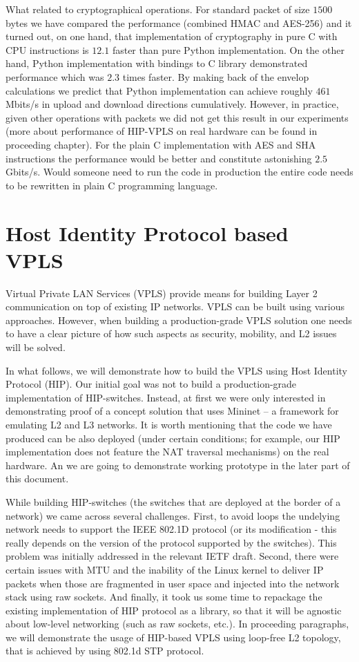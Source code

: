 What related to cryptographical operations. For standard packet of size $1500$ 
bytes we have compared the performance (combined HMAC and AES-256) and it turned 
out, on one hand, that implementation of cryptography in pure C with CPU instructions is 
$12.1$ faster than pure Python implementation. On the other hand, Python implementation with bindings
to C library demonstrated performance which was $2.3$ times faster. By making back of the envelop calculations
we predict that Python implementation can achieve roughly $461$ Mbits/s in upload and download directions
cumulatively. However, in practice, given other operations with packets we did not get this result 
in our experiments (more about performance of HIP-VPLS on real hardware can be found in proceeding 
chapter). For the plain C implementation with AES and SHA instructions the performance would be 
better and constitute astonishing $2.5$ Gbits/s. Would someone need to run the code in production
the entire code needs to be rewritten in plain C programming language.

\section{Host Identity Protocol based VPLS}

Virtual Private LAN Services (VPLS) provide means for building Layer 2 communication 
on top of existing IP networks. VPLS can be built using various approaches. However, 
when building a production-grade VPLS solution one needs to have a clear picture of 
how such aspects as security, mobility, and L2 issues will be solved.

In what follows, we will demonstrate how to build the VPLS using Host Identity Protocol (HIP). 
Our initial goal was not to build a production-grade implementation of HIP-switches. Instead, 
at first we were only interested in demonstrating proof of a concept solution that uses 
Mininet – a framework for emulating L2 and L3 networks. It is worth mentioning that the code 
we have produced can be also deployed (under certain conditions; for example, our HIP implementation 
does not feature the NAT traversal mechanisms) on the real hardware. An we are going to demonstrate 
working prototype in the later part of this document.

While building HIP-switches (the switches that are deployed at the border of a network) 
we came across several challenges. First, to avoid loops the undelying network needs to support 
the IEEE 802.1D protocol (or its modification - this really depends on the version of the protocol 
supported by the switches). This problem was initially addressed in the relevant IETF draft. 
Second, there were certain issues with MTU and the inability of the Linux kernel to deliver IP 
packets when those are fragmented in user space and injected into the network stack using raw 
sockets. And finally, it took us some time to repackage the existing implementation of HIP protocol 
as a library, so that it will be agnostic about low-level networking (such as raw sockets, etc.). 
In proceeding paragraphs, we will demonstrate the usage of HIP-based VPLS using loop-free L2 topology,
that is achieved by using 802.1d STP protocol.

